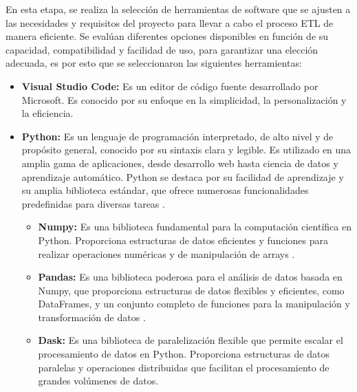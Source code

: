 En esta etapa, se realiza la selección de herramientas de software que se ajusten a las necesidades y requisitos del proyecto para llevar a cabo el proceso ETL de manera eficiente. Se evalúan diferentes opciones disponibles en función de su capacidad, compatibilidad y facilidad de uso, para garantizar una elección adecuada, es por esto que se seleccionaron las siguientes herramientas:
\begin{itemize}
    \item \textbf{Visual Studio Code:} Es un editor de código fuente desarrollado por Microsoft. Es conocido por su enfoque en la simplicidad, la personalización y la eficiencia. 
    \item \textbf{Python:} Es un lenguaje de programación interpretado, de alto nivel y de propósito general, conocido por su sintaxis clara y legible. Es utilizado en una amplia gama de aplicaciones, desde desarrollo web hasta ciencia de datos y aprendizaje automático. Python se destaca por su facilidad de aprendizaje y su amplia biblioteca estándar, que ofrece numerosas funcionalidades predefinidas para diversas tareas \cite{python}.
    \begin{itemize}
        \item \textbf{Numpy:} Es una biblioteca fundamental para la computación científica en Python. Proporciona estructuras de datos eficientes y funciones para realizar operaciones numéricas y de manipulación de arrays \cite{numpy}.
        \item \textbf{Pandas:} Es una biblioteca poderosa para el análisis de datos basada en Numpy, que proporciona estructuras de datos flexibles y eficientes, como DataFrames, y un conjunto completo de funciones para la manipulación y transformación de datos \cite{pandas}.
        \item \textbf{Dask:} Es una biblioteca de paralelización flexible que permite escalar el procesamiento de datos en Python. Proporciona estructuras de datos paralelas y operaciones distribuidas que facilitan el procesamiento de grandes volúmenes de datos.
    \end{itemize}
\end{itemize}
